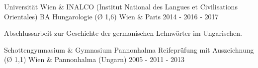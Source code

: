 \begin{cventries}
  \cventry
    {Universität Wien \& INALCO (Institut National des Langues et Civilisations Orientales)} %
    {BA Hungarologie (Ø 1,6)} %
    {Wien \& Paris} %
    {2014 - 2016 - 2017} %
    {
      \begin{cvitems} %
        \item {Abschlussarbeit zur Geschichte der germanischen Lehnwörter im Ungarischen.}
      \end{cvitems}
    }
        
  \cventry
    {Schottengymnasium \& Gymnasium Pannonhalma} %
    {Reifeprüfung mit Auszeichnung (Ø 1,1)} %
    {Wien \& Pannonhalma (Ungarn)} %
    {2005 - 2011 - 2013} %
    {}
\end{cventries}
